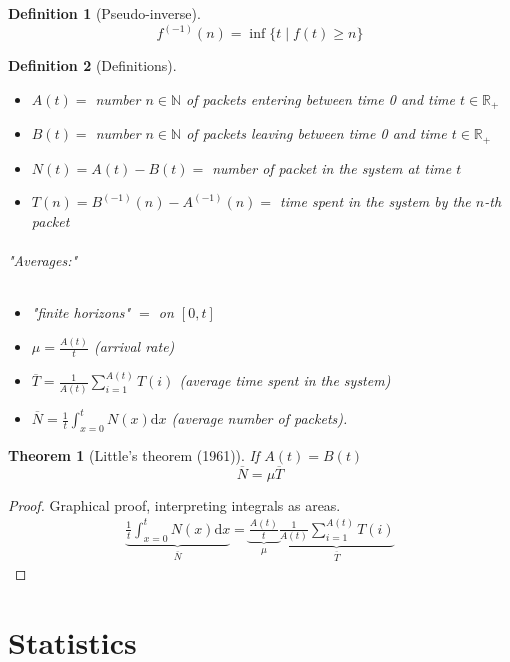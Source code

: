 \documentclass{article}
\newcommand{\deriv}{\mathrm{d}}
\newtheorem{thm}{Theorem}
\newtheorem{defi}{Definition}
\begin{document}
\begin{defi}[Pseudo-inverse]
\[f^{(-1)}(n)=\inf \{t\;|\; f(t)\geq n \}\]
\end{defi}

\begin{defi}[Definitions]
\begin{itemize}
\item $A(t)=$ number $n\in \mathbb{N}$ of packets entering between time 0 and time $t \in \mathbb{R}_{+}$
\item $B(t)=$  number $n\in \mathbb{N}$ of packets leaving between time 0 and time $t \in \mathbb{R}_{+}$
\item $N(t)=A(t)-B(t)=$ number of packet \emph{in} the system at time $t$
\item $T(n)=B^{(-1)}(n)-A^{(-1)}(n)=$ time spent in the system by the $n$-th packet
\end{itemize}
\paragraph{"Averages:"}
\begin{itemize}
\item "finite horizons" $=$ on $[0,t]$
\item $\mu = \frac{A(t)}{t}$ (arrival rate)
\item $\overline{T}=\frac{1}{A(t)}\sum_{i=1}^{A(t)}T(i)$ (average time spent in the system)
\item $\overline{N}=\frac{1}{t}\int_{x=0}^t N(x) \deriv x$ (average number of packets).
\end{itemize}
\end{defi}


\begin{thm}[Little's theorem (1961)]
If $A(t)=B(t)$
\[\overline{N} = \mu \overline{T}\]
\end{thm}

\begin{proof}
Graphical proof, interpreting integrals as areas.
\begin{align*}
\underbrace{\frac{1}{t}\int_{x=0}^t N(x) \deriv x}_{\overline{N}} = \underbrace{\frac{A(t)}{t}}_{\mu} \underbrace{\frac{1}{A(t)}\sum_{i=1}^{A(t)}T(i)}_{\overline{T}}
\end{align*}
\end{proof}

\setcounter{section}{0}
\part{Statistics}
\end{document}
